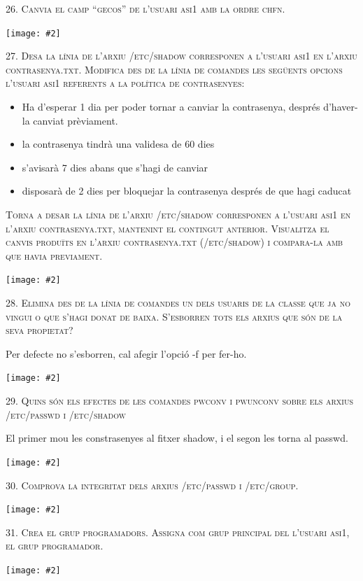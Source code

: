 \documentclass[a4paper,12pt]{article}
\newcommand{\mygraphic}[2][width=\textwidth]{\begin{center}
		\centering\texttt{[image: \#2]}\par
\end{center}}
\begin{document}
\textsc{26. Canvia el camp “gecos” de l’usuari asi1 amb la ordre chfn.}
\mygraphic{imatges/26.png}

\textsc{27. Desa la línia de l’arxiu /etc/shadow corresponen a l’usuari asi1 en l’arxiu contrasenya.txt. Modifica des de la línia de comandes les següents opcions l’usuari asi1 referents a la política de contrasenyes:}

\begin{itemize}
\item Ha d’esperar 1 dia per poder tornar a canviar la contrasenya, després d’haver-la canviat prèviament.
\item la contrasenya tindrà una validesa de 60 dies
\item s’avisarà 7 dies abans que s’hagi de canviar
\item disposarà de 2 dies per bloquejar la contrasenya després de que hagi caducat
\end{itemize}

\textsc{Torna a desar la línia de l’arxiu /etc/shadow corresponen a l’usuari asi1 en l’arxiu contrasenya.txt, mantenint el contingut anterior. Visualitza el canvis produïts en l’arxiu contrasenya.txt (/etc/shadow) i compara-la amb que havia previament.}
\mygraphic{imatges/27.png}

\newpage
\textsc{28. Elimina des de la línia de comandes un dels usuaris de la classe que ja no vingui o que s’hagi donat de baixa. S’esborren tots els arxius que són de la seva propietat?}

Per defecte no s'esborren, cal afegir l'opció -f per fer-ho.
\mygraphic{imatges/28.png}

\newpage
\textsc{29. Quins són els efectes de les comandes pwconv i pwunconv sobre els arxius /etc/passwd i /etc/shadow}

El primer mou les constrasenyes al fitxer shadow, i el segon les torna al passwd.
\mygraphic{imatges/29.png}

\newpage
\textsc{30. Comprova la integritat dels arxius /etc/passwd i /etc/group.}
\mygraphic{imatges/30.png}

\newpage
\textsc{31. Crea el grup programadors. Assigna com grup principal del l’usuari asi1, el grup programador.}
\mygraphic{imatges/31.png}
\end{document}
